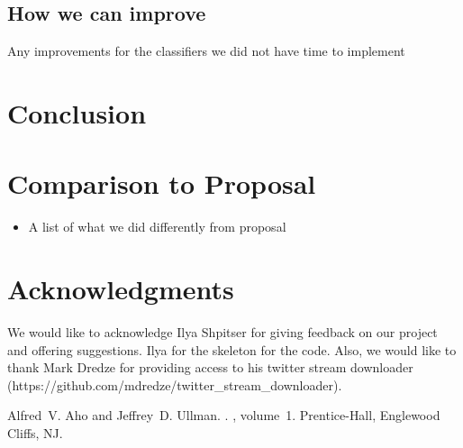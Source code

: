 \documentclass[11pt,letterpaper]{article}
\begin{document}
\subsection{How we can improve}
Any improvements for the classifiers we did not have time to implement

\section{Conclusion}

\section{Comparison to Proposal}

\begin{itemize}
\item A list of what we did differently from proposal
\end{itemize}

\section*{Acknowledgments}
We would like to acknowledge Ilya Shpitser for giving feedback on our project and offering suggestions. Ilya for the skeleton for the code.
Also, we would like to thank Mark Dredze for providing access to his twitter stream downloader (https://github.com/mdredze/twitter_stream_downloader).

\begin{thebibliography}{}

Alfred~V. Aho and Jeffrey~D. Ullman.
.
, volume~1.
\newblock Prentice-{Hall}, Englewood Cliffs, NJ.

\end{thebibliography}
\end{document}
